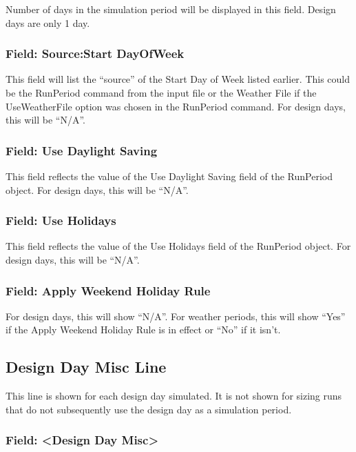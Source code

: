 Number of days in the simulation period will be displayed in this field. Design days are only 1 day.

\subsubsection{Field: Source:Start DayOfWeek}\label{field-sourcestart-dayofweek}

This field will list the ``source'' of the Start Day of Week listed earlier. This could be the RunPeriod command from the input file or the Weather File if the UseWeatherFile option was chosen in the RunPeriod command. For design days, this will be ``N/A''.

\subsubsection{Field: Use Daylight Saving}\label{field-use-daylight-saving}

This field reflects the value of the Use Daylight Saving field of the RunPeriod object. For design days, this will be ``N/A''.

\subsubsection{Field: Use Holidays}\label{field-use-holidays}

This field reflects the value of the Use Holidays field of the RunPeriod object. For design days, this will be ``N/A''.

\subsubsection{Field: Apply Weekend Holiday Rule}\label{field-apply-weekend-holiday-rule}

For design days, this will show ``N/A''. For weather periods, this will show ``Yes'' if the Apply Weekend Holiday Rule is in effect or ``No'' if it isn't.

\subsection{Design Day Misc Line}\label{design-day-misc-line}

This line is shown for each design day simulated. It is not shown for sizing runs that do not subsequently use the design day as a simulation period.

\subsubsection{Field: \textless{}Design Day Misc\textgreater{}}\label{field-design-day-misc}

